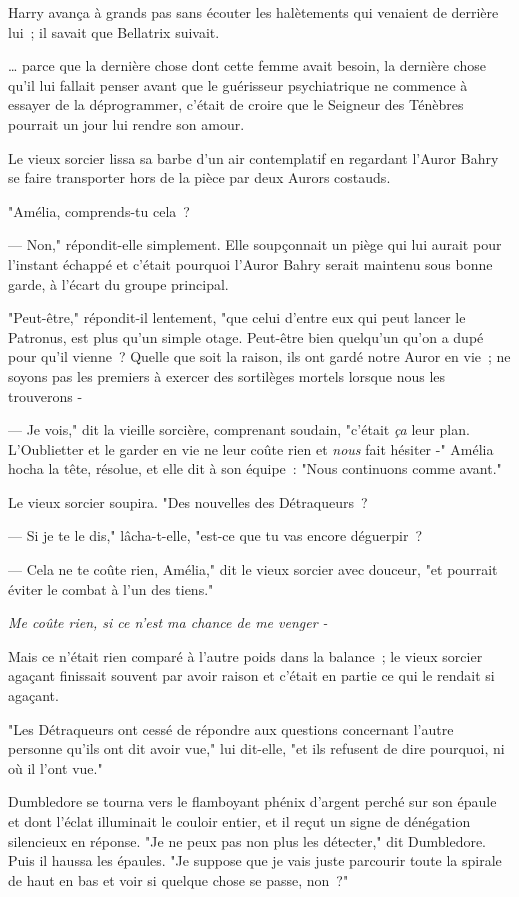 Harry avança à grands pas sans écouter les halètements qui venaient de derrière lui~; il savait que Bellatrix suivait.

… parce que la dernière chose dont cette femme avait besoin, la dernière chose qu'il lui fallait penser avant que le guérisseur psychiatrique ne commence à essayer de la déprogrammer, c'était de croire que le Seigneur des Ténèbres pourrait un jour lui rendre son amour.

\later

Le vieux sorcier lissa sa barbe d'un air contemplatif en regardant l'Auror Bahry se faire transporter hors de la pièce par deux Aurors costauds.

"Amélia, comprends-tu cela~?

--- Non," répondit-elle simplement. Elle soupçonnait un piège qui lui aurait pour l'instant échappé et c'était pourquoi l'Auror Bahry serait maintenu sous bonne garde, à l'écart du groupe principal.

"Peut-être," répondit-il lentement, "que celui d'entre eux qui peut lancer le Patronus, est plus qu'un simple otage. Peut-être bien quelqu'un qu'on a dupé pour qu'il vienne~? Quelle que soit la raison, ils ont gardé notre Auror en vie~; ne soyons pas les premiers à exercer des sortilèges mortels lorsque nous les trouverons -

--- Je vois," dit la vieille sorcière, comprenant soudain, "c'était \emph{ça} leur plan. L'Oublietter et le garder en vie ne leur coûte rien et \emph{nous} fait hésiter -" Amélia hocha la tête, résolue, et elle dit à son équipe~: "Nous continuons comme avant."

Le vieux sorcier soupira. "Des nouvelles des Détraqueurs~?

--- Si je te le dis," lâcha-t-elle, "est-ce que tu vas encore déguerpir~?

--- Cela ne te coûte rien, Amélia," dit le vieux sorcier avec douceur, "et pourrait éviter le combat à l'un des tiens."

\emph{Me coûte rien, si ce n'est ma chance de me venger -}

Mais ce n'était rien comparé à l'autre poids dans la balance~; le vieux sorcier agaçant finissait souvent par avoir raison et c'était en partie ce qui le rendait si agaçant.

"Les Détraqueurs ont cessé de répondre aux questions concernant l'autre personne qu'ils ont dit avoir vue," lui dit-elle, "et ils refusent de dire pourquoi, ni où il l'ont vue."

Dumbledore se tourna vers le flamboyant phénix d'argent perché sur son épaule et dont l'éclat illuminait le couloir entier, et il reçut un signe de dénégation silencieux en réponse. "Je ne peux pas non plus les détecter," dit Dumbledore. Puis il haussa les épaules. "Je suppose que je vais juste parcourir toute la spirale de haut en bas et voir si quelque chose se passe, non~?"

